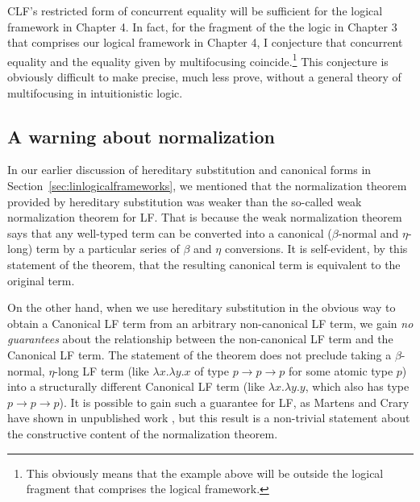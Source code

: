 CLF's restricted form of concurrent equality will be sufficient for
the logical framework in Chapter 4. In fact, for the fragment of the
the logic in Chapter 3 that comprises our logical framework in Chapter
4, I conjecture that concurrent equality and the equality given by
multifocusing coincide.\footnote{This obviously means that the example
  above will be outside the logical fragment that comprises the logical
  framework.}  This conjecture is obviously difficult to make precise,
much less prove, without a general theory of multifocusing in
intuitionistic logic.


\subsection{A warning about normalization}
\label{sec:warning}

In our earlier discussion of hereditary substitution and canonical
forms in Section~\ref{sec:linlogicalframeworks}, we mentioned that the
normalization theorem provided by hereditary substitution was weaker
than the so-called weak normalization theorem for LF. That is because
the weak normalization theorem says that any well-typed term can be
converted into a canonical ($\beta$-normal and $\eta$-long) term by a
particular series of $\beta$ and $\eta$ conversions. It is
self-evident, by this statement of the theorem, that the resulting
canonical term is equivalent to the original term.

On the other hand, when we use hereditary substitution in the obvious
way to obtain a Canonical LF term from an arbitrary non-canonical LF
term, we gain {\it no guarantees} about the relationship between the
non-canonical LF term and the Canonical LF term. The statement of the
theorem does not preclude taking a $\beta$-normal, $\eta$-long LF term
(like $\lambda x. \lambda y. x$ of type $p \rightarrow p \rightarrow
p$ for some atomic type $p$) into a structurally different Canonical
LF term (like $\lambda x. \lambda y. y$, which also has type $p
\rightarrow p \rightarrow p$). It is possible to gain such a guarantee
for LF, as Martens and Crary have shown in unpublished work
\cite{martens11mechanizing}, but this result is a non-trivial statement
about the constructive content of the normalization theorem. 


